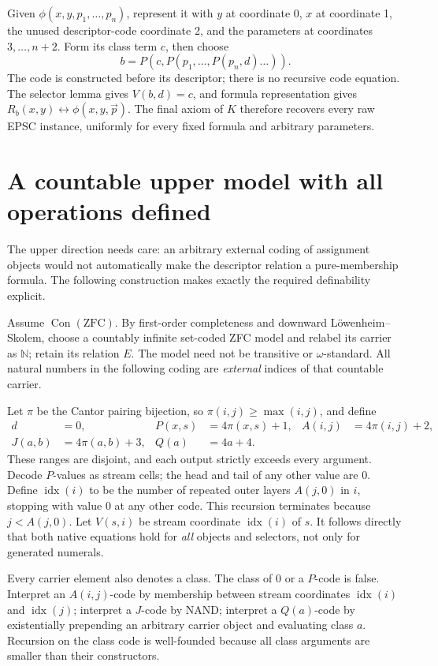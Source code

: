 \documentclass[11pt]{article}
\newcommand{\Con}{\operatorname{Con}}
\begin{document}
Given $\phi(x,y,p_1,\ldots,p_n)$, represent it with $y$ at coordinate 0, $x$ at coordinate 1, the unused descriptor-code coordinate 2, and the parameters at coordinates $3,\ldots,n+2$. Form its class term $c$, then choose
\[
 b=P(c,P(p_1,\ldots,P(p_n,d)\ldots)).
\]
The code is constructed before its descriptor; there is no recursive code equation. The selector lemma gives $V(b,d)=c$, and formula representation gives
$R_b(x,y)\leftrightarrow\phi(x,y,\vec p)$. The final axiom of $K$ therefore recovers every raw EPSC instance, uniformly for every fixed formula and arbitrary parameters.

\section{A countable upper model with all operations defined}

The upper direction needs care: an arbitrary external coding of assignment objects would not automatically make the descriptor relation a pure-membership formula. The following construction makes exactly the required definability explicit.

Assume $\Con(\mathrm{ZFC})$. By first-order completeness and downward L\"owenheim--Skolem, choose a countably infinite set-coded ZFC model and relabel its carrier as $\mathbb N$; retain its relation $E$. The model need not be transitive or $\omega$-standard. All natural numbers in the following coding are \emph{external} indices of that countable carrier.

Let $\pi$ be the Cantor pairing bijection, so $\pi(i,j)\geq\max(i,j)$, and define
\begin{align*}
 d&=0,&P(x,s)&=4\pi(x,s)+1,&A(i,j)&=4\pi(i,j)+2,\\
 J(a,b)&=4\pi(a,b)+3,&Q(a)&=4a+4.
\end{align*}
These ranges are disjoint, and each output strictly exceeds every argument. Decode $P$-values as stream cells; the head and tail of any other value are 0. Define $\operatorname{idx}(i)$ to be the number of repeated outer layers $A(j,0)$ in $i$, stopping with value 0 at any other code. This recursion terminates because $j<A(j,0)$. Let $V(s,i)$ be stream coordinate $\operatorname{idx}(i)$ of $s$. It follows directly that both native equations hold for \emph{all} objects and selectors, not only for generated numerals.

Every carrier element also denotes a class. The class of $0$ or a $P$-code is false. Interpret an $A(i,j)$-code by membership between stream coordinates $\operatorname{idx}(i)$ and $\operatorname{idx}(j)$; interpret a $J$-code by NAND; interpret a $Q(a)$-code by existentially prepending an arbitrary carrier object and evaluating class $a$. Recursion on the class code is well-founded because all class arguments are smaller than their constructors.
\end{document}
